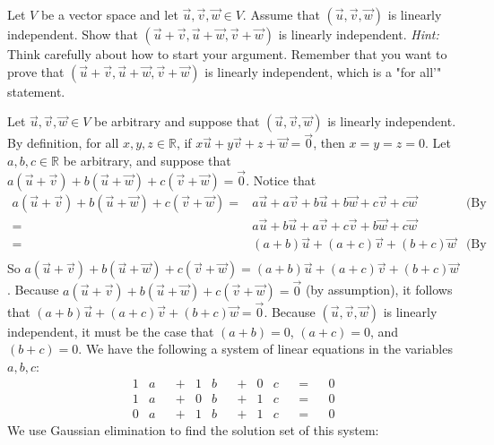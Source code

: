 \documentclass[12pt]{article}
\newenvironment{problem}[2][Problem]
{
	\begin{trivlist} 
		\item[\hskip \labelsep {\bfseries #1 #2:}]
	}
{
	\end{trivlist}
	}
\newenvironment{solution}[1][Solution]
{
	\begin{trivlist} 
		\item[\hskip \labelsep {\itshape #1:}]
	}
	{
	\end{trivlist}
}
\begin{document}
\newpage
\begin{problem}{2}
Let $V$ be a vector space and let $\vec{u},\vec{v},\vec{w} \in V$. Assume that $(\vec{u},\vec{v},\vec{w})$ is linearly independent. Show that $(\vec{u}+\vec{v}, \vec{u}+\vec{w},\vec{v}+\vec{w})$ is linearly independent.
\newline
\noindent
{\it Hint:} Think carefully about how to start your argument. Remember that you want to prove that $(\vec{u}+\vec{v}, \vec{u}+\vec{w},\vec{v}+\vec{w})$ is linearly independent, which is a "for all'" statement.
\noindent
\newline
\newline
\begin{solution}
Let $\vec{u},\vec{v},\vec{w} \in V$ be arbitrary and suppose that $(\vec{u},\vec{v},\vec{w})$ is linearly independent. By definition, for all $x,y,z \in \mathbb{R}$, if $x \vec{u} + y \vec{v} + z + \vec{w} = \vec{0}$, then $x=y=z=0$. Let $a,b,c \in \mathbb{R}$ be arbitrary, and suppose that $a(\vec{u} +\vec{v}) + b(\vec{u}+\vec{w})+c(\vec{v}+\vec{w}) =\vec{0}$. Notice that
\begin{align*}
a(\vec{u} +\vec{v}) + b(\vec{u}+\vec{w})+c(\vec{v}+\vec{w}) =& a\vec{u} + a\vec{v}+ b\vec{u}+ b\vec{w} + c\vec{v}+ c\vec{w} & \text{(By Property 8 of vector spaces.)}\\
=& a\vec{u} + b\vec{u} + a\vec{v} + c\vec{v} + b\vec{w} + c\vec{w} &\\
=& (a+b) \vec{u} + (a+c) \vec{v} + (b+c) \vec{w} & \text{(By Property 8 of vector spaces)}\\
\end{align*}
So $a(\vec{u} +\vec{v}) + b(\vec{u}+\vec{w})+c(\vec{v}+\vec{w}) = (a+b) \vec{u} + (a+c) \vec{v} + (b+c) \vec{w}$. Because $a(\vec{u} +\vec{v}) + b(\vec{u}+\vec{w})+c(\vec{v}+\vec{w}) =\vec{0}$ (by assumption), it follows that $(a+b) \vec{u} + (a+c) \vec{v} + (b+c) \vec{w} = \vec{0}$. Because $(\vec{u},\vec{v},\vec{w})$ is linearly independent, it must be the case that $(a+b) = 0$, $(a+c) =0$, and  $(b+c) = 0$. We have the following a system of linear equations in the variables $a,b,c$:
\begin{align*}
&&&& &&&& &&&& 1&a& &+&  1&b& &+& 0&c& &=& &0& &&&& &&&& &&&& \\
&&&& &&&& &&&& 1&a& &+&  0&b& &+& 1&c& &=& &0& &&&& &&&& &&&& \\
&&&& &&&& &&&& 0&a& &+&  1&b& &+& 1&c& &=& &0& &&&& &&&& &&&& 
\end{align*}
We use Gaussian elimination to find the solution set of this system:

\end{solution}
\end{problem}
\end{document}
